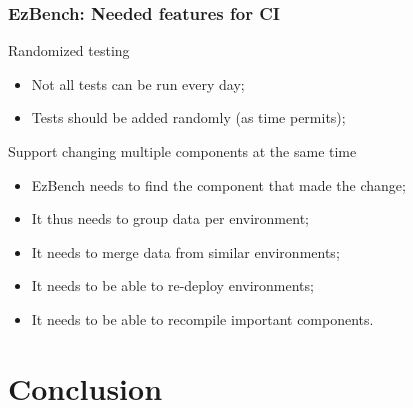 \documentclass[11pt,english,compress]{beamer}
\begin{document}
\begin{frame}
	\frametitle{EzBench: Needed features for CI}

	\begin{block}{Randomized testing}
		\begin{itemize}
			\item Not all tests can be run every day;
			\item Tests should be added randomly (as time permits);
		\end{itemize}
	\end{block}
	
	\pause
	
	\begin{block}{Support changing multiple components at the same time}
		\begin{itemize}
			\item EzBench needs to find the component that made the change;
			\item It thus needs to group data per environment;
			\item It needs to merge data from similar environments;
			\item It needs to be able to re-deploy environments;
			\item It needs to be able to recompile important components.
		\end{itemize}
	\end{block}
\end{frame}

\section{Conclusion}
\end{document}
